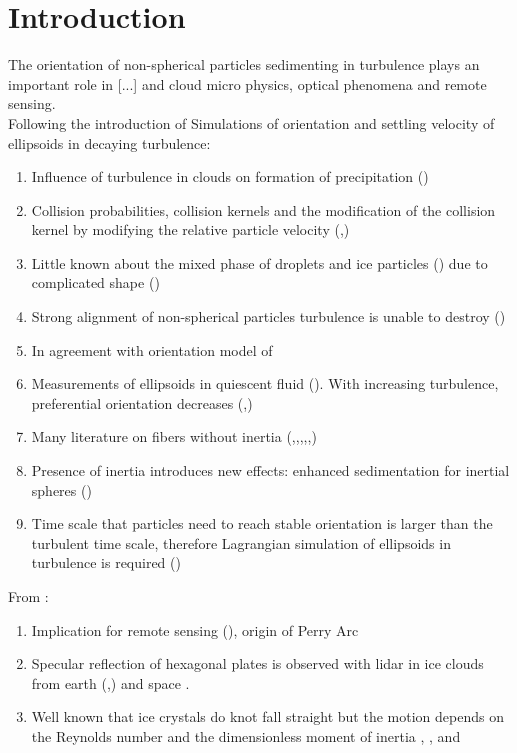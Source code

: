 \documentclass[]{jfm}
\begin{document}
\section{Introduction}
The orientation of non-spherical particles sedimenting in turbulence plays an important role in [...] and cloud micro physics, optical phenomena and remote sensing. \\

Following the introduction of \cite{2013Siewert} Simulations of orientation and settling velocity of ellipsoids in decaying turbulence: \\
\begin{enumerate}[I]
\item Influence of turbulence in clouds on formation of precipitation (\cite{2012Devenish})
\item Collision probabilities, collision kernels and the modification of the collision kernel by modifying the relative particle velocity (\cite{2010Beheng},\cite{2013Grabowski})
\item Little known about the mixed phase of droplets and ice particles (\cite{1998Pinsky}) due to complicated shape (\cite{1997Pruppacher})
\item Strong alignment of non-spherical particles turbulence is unable to destroy (\cite{1981Cho})
\item In agreement with orientation model of \cite{1995Klett}
\item Measurements of ellipsoids in quiescent fluid (\cite{1994Newsom}). With increasing turbulence, preferential orientation decreases (\cite{1988Krushkal},\cite{1998Newsom})
\item Many literature on fibers without inertia (\cite{2005Parsheh},\cite{2005Shin},\cite{2009Wilkinson},\cite{2011Parsa},\cite{2011Pumir},\cite{2012Parsa})
\item Presence of inertia introduces new effects: enhanced sedimentation for inertial spheres (\cite{1993Wang})
\item Time scale that particles need to reach stable orientation is larger than the turbulent time scale, therefore Lagrangian simulation of ellipsoids in turbulence is required (\cite{2012Gavze})\\
\end{enumerate} 

From \cite{2014Hashino}:\\
\begin{enumerate}[I]
\item Implication for remote sensing (\cite{2011Westbrook}), origin of Perry Arc
\item Specular reflection of hexagonal plates is observed with lidar in ice clouds from earth (\cite{2002Noel},\cite{2010Westbrook}) and space \cite{2007Hu}.
\item Well known that ice crystals do knot fall straight but the motion depends on the Reynolds number and the dimensionless moment of inertia \cite{1964Willmarth}, \cite{1972Zikmunda}, \cite{1997Field} and \cite{1992Kajikawa}\\
\end{enumerate}
\end{document}
